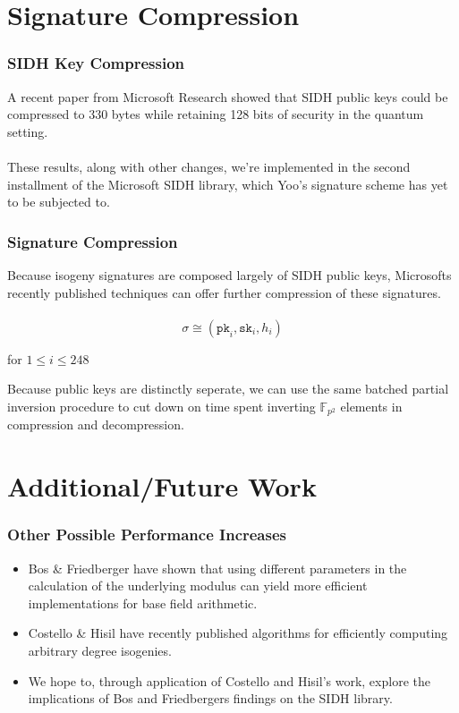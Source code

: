 \documentclass{beamer}
\begin{document}
\section{Signature Compression}

\begin{frame}
\frametitle{SIDH Key Compression}
A recent paper from Microsoft Research showed that SIDH public keys could be compressed to 330 bytes while retaining 128 bits of security in the quantum setting.\\~\\

These results, along with other changes, we're implemented in the second installment of the Microsoft SIDH library, which Yoo's signature scheme has yet to be subjected to.\\
\end{frame}

\begin{frame}
\frametitle{Signature Compression}
Because isogeny signatures are composed largely of SIDH public keys, Microsofts recently published techniques can offer further compression of these signatures.\\~\\

$$
\sigma \cong (\texttt{pk}_i, \texttt{sk}_i, h_i)
$$
\begin{center}for $1 \leq i \leq 248$\end{center}

Because public keys are distinctly seperate, we can use the same batched partial inversion procedure to cut down on time spent inverting $\mathbb{F}_{p^{2}}$ elements in compression and decompression.
\end{frame}

\section{Additional/Future Work}

\begin{frame}
\frametitle{Other Possible Performance Increases}
\begin{itemize}
\item Bos \& Friedberger have shown that using different parameters in the calculation of the underlying modulus can yield more efficient implementations for base field arithmetic.
\item Costello \& Hisil have recently published algorithms for efficiently computing arbitrary degree isogenies.
\item We hope to, through application of Costello and Hisil's work, explore the implications of Bos and Friedbergers findings on the SIDH library.\\
\end{itemize}
\end{frame}
\end{document}
